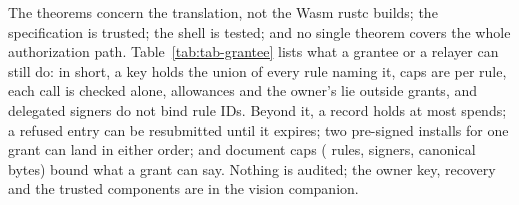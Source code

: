The theorems concern the translation, not the Wasm rustc builds; the
specification is trusted; the shell is tested; and no single theorem covers the
whole authorization path. Table~\ref{tab:tab-grantee} lists what a grantee or a
relayer can still do: in short, a key holds the union of every rule naming it,
caps are per rule, each call is checked alone, allowances and the owner's
 lie outside grants, and delegated signers do not bind rule IDs.
Beyond it, a record holds at most  spends; a refused
entry can be resubmitted until it expires; two pre-signed installs for one grant
can land in either order; and document caps ( rules,
 signers,  canonical bytes)
bound what a grant can say. Nothing is audited; the owner key, recovery and the
trusted components are in the vision companion.
